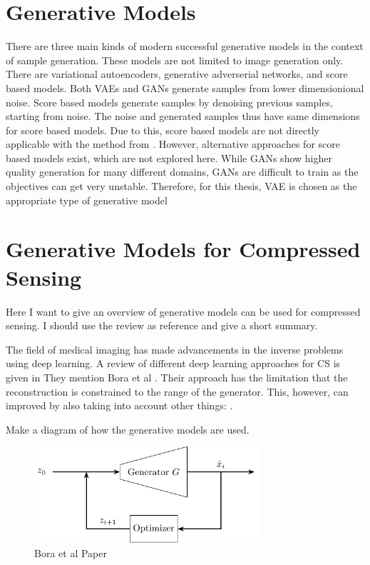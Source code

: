 \section{Generative Models}
There are three main kinds of modern successful generative models in the context of sample generation.
These models are not limited to image generation only.
There are variational autoencoders, generative adverserial networks, and score based models.
Both VAEs and GANs generate samples from lower dimensionional noise.
Score based models generate samples by denoising previous samples, starting from noise.
The noise and generated samples thus have same dimensions for score based models.
Due to this, score based models are not directly applicable with the method from \parencite{CSUsingAI}.
However, alternative approaches for score based models exist, which are not explored here.
While GANs show higher quality generation for many different domains, GANs are difficult to train as the objectives can get very unstable.
Therefore, for this thesis, VAE is chosen as the appropriate type of generative model

\section{Generative Models for Compressed Sensing}
Here I want to give an overview of generative models can be used for compressed sensing.
I should use the review as reference and give a short summary.

The field of medical imaging has made advancements in the inverse problems using deep learning.
A review of different deep learning approaches for CS is given in \parencite{ReviewCSUsingAI}
They mention Bora et al \parencite{CSUsingAI}.
Their approach has the limitation that the reconstruction is constrained to the range of the generator.
This, however, can improved by also taking into account other things: \parencite{SparseCSUsingAI}.

Make a diagram of how the generative models are used.
\begin{figure}[h!]
    \centering
    \includegraphics[width=0.75\textwidth]{figures/02_related_work/latent_variable_optimization/build/latent_variable_optimization.pdf}
    \caption{Bora et al Paper}
\end{figure}

